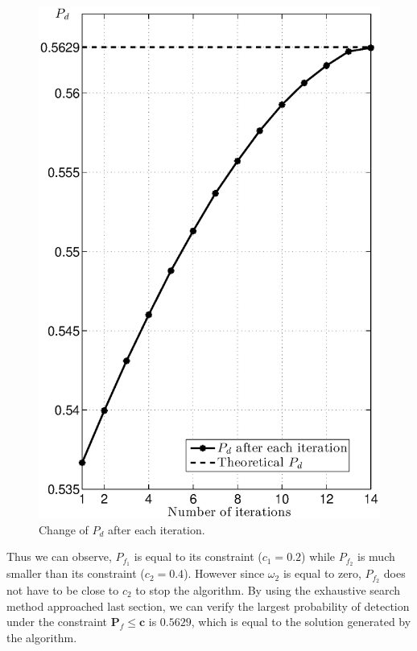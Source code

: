 \begin{figure}[H]
\centering
\includegraphics[width = 14cm]{2/24pd.eps}
\caption{Change of $P_d$ after each iteration.}
\label{fig: 2.5}
\end{figure}
\newpage


Thus we can observe, $P_{f_1}$ is equal to its constraint ($c_1 = 0.2$) while $P_{f_2}$ is much smaller than its constraint ($c_2 =0.4$). However since $\omega_2$ is equal to zero, $P_{f_2}$ does not have to be close to $c_2$ to stop the algorithm. By using the exhaustive search method approached last section, we can verify the largest probability of detection under the constraint $\mathbf{P}_f \leq \mathbf{c}$ is $0.5629$, which is equal to the solution generated by the algorithm.
